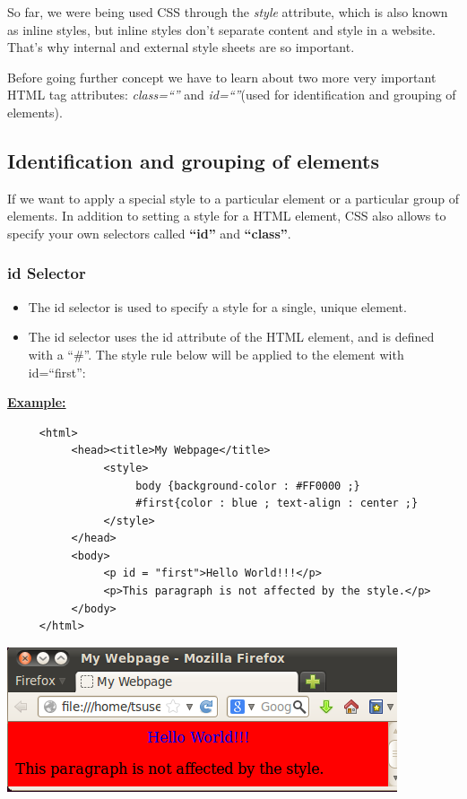 \documentclass[11pt,a4paper]{article}
\begin{document}
So far, we were being used CSS through the \emph{style} attribute, which is also known as inline styles, but inline styles don't separate content and style in a website. That's why internal and external style sheets are so important.

Before going further concept we have to learn about two more very important HTML tag attributes: \emph{class=``''} and \emph{id=``''}(used for identification and grouping of elements).

\subsection*{Identification and grouping of elements}
If we want to apply a special style to a particular element or a particular group of elements. In addition to setting a style for a HTML element, CSS also allows to specify your own selectors called \textbf{``id''} and \textbf{``class''}.


\subsubsection*{id Selector}
\begin{itemize}
\item The id selector is used to specify a style for a single, unique element.
\item The id selector uses the id attribute of the HTML element, and is defined with a ``\#''.
 The style rule below will be applied to the element with id=``first'':
\end{itemize}
\underline{\textbf{Example:}}
\begin{verbatim}
     <html>
          <head><title>My Webpage</title>
               <style>
                    body {background-color : #FF0000 ;}
                    #first{color : blue ; text-align : center ;}
               </style>
          </head>
          <body>
               <p id = "first">Hello World!!!</p>
               <p>This paragraph is not affected by the style.</p>
          </body>
     </html>
\end{verbatim}
\begin{center}
\includegraphics[scale=0.7]{IdSelector}
\end{center}
\end{document}
